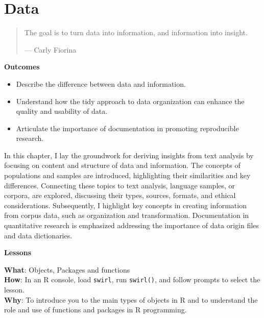 \documentclass[
  letterpaper,
]{latex/krantz}
\providecommand{\tightlist}{%
  \setlength{\itemsep}{0pt}\setlength{\parskip}{0pt}}\usepackage{longtable,booktabs,array}
\theoremstyle{definition}
\theoremstyle{remark}
\begin{document}
\chapter{Data}\label{sec-data-chapter}

\begin{quote}
The goal is to turn data into information, and information into insight.

--- Carly Fiorina
\end{quote}

\begin{tcolorbox}[enhanced jigsaw, breakable, leftrule=.75mm, arc=.35mm, colframe=quarto-callout-color-frame, colback=white, left=2mm, bottomrule=.15mm, rightrule=.15mm, toprule=.15mm, opacityback=0]

\textbf{ Outcomes}

\begin{itemize}
\tightlist
\item
  Describe the difference between data and information.
\item
  Understand how the tidy approach to data organization can enhance the
  quality and usability of data.
\item
  Articulate the importance of documentation in promoting reproducible
  research.
\end{itemize}

\end{tcolorbox}

In this chapter, I lay the groundwork for deriving insights from text
analysis by focusing on content and structure of data and information.
The concepts of populations and samples are introduced, highlighting
their similarities and key differences. Connecting these topics to text
analysis, language samples, or corpora, are explored, discussing their
types, sources, formats, and ethical considerations. Subsequently, I
highlight key concepts in creating information from corpus data, such as
organization and transformation. Documentation in quantitative research
is emphasized addressing the importance of data origin files and data
dictionaries.

\begin{tcolorbox}[enhanced jigsaw, breakable, leftrule=.75mm, arc=.35mm, colframe=quarto-callout-color-frame, colback=white, left=2mm, bottomrule=.15mm, rightrule=.15mm, toprule=.15mm, opacityback=0]

\textbf{ Lessons}

\textbf{What}: Objects, Packages and functions\\
\textbf{How}: In an R console, load \texttt{swirl}, run
\texttt{swirl()}, and follow prompts to select the lesson.\\
\textbf{Why}: To introduce you to the main types of objects in R and to
understand the role and use of functions and packages in R programming.

\end{tcolorbox}
\end{document}
